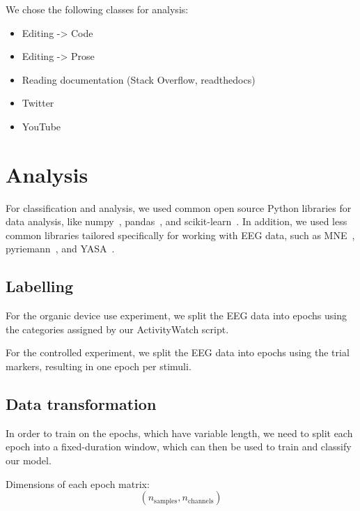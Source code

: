 We chose the following classes for analysis:

\begin{itemize}
        \item Editing -> Code
        \item Editing -> Prose
        \item Reading documentation (Stack Overflow, readthedocs)
        \item Twitter
        \item YouTube
\end{itemize}

\vfill
\pagebreak
\section{Analysis}

    For classification and analysis, we used common open source Python libraries for data analysis, like numpy~\cite{harris2020array}, pandas~\cite{reback2020pandas}, and scikit-learn~\cite{scikit-learn}. In addition, we used less common libraries tailored specifically for working with EEG data, such as MNE~\cite{noauthor_mne-python_2020}, pyriemann~\cite{alexandre_barachant_2020_3715511}, and YASA~\cite{vallat_yasa_2020}.

    \subsection{Labelling}
        For the organic device use experiment, we split the EEG data into epochs using the categories assigned by our ActivityWatch script.

        For the controlled experiment, we split the EEG data into epochs using the trial markers, resulting in one epoch per stimuli.


    \subsection{Data transformation}\label{section:transform}

        In order to train on the epochs, which have variable length, we need to split each epoch into a fixed-duration window, which can then be used to train and classify our model.

        Dimensions of each epoch matrix: \[ (n_{\mathrm{samples}}, n_{\mathrm{channels}}) \]

